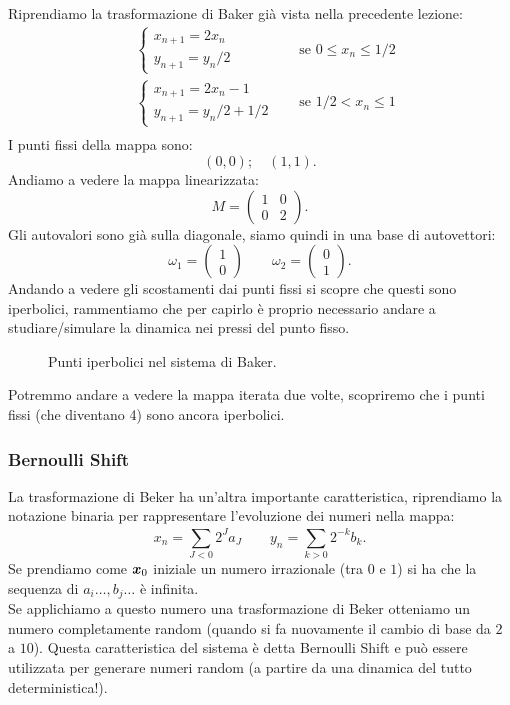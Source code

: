 \noindent
\begin{exmp}
    Riprendiamo la trasformazione di Baker già vista nella precedente lezione:
    \[\begin{aligned}
	&
        \begin{cases}
            x_{n+1} = 2 x_n\\
	    y_{n+1} = y_n /2
	\end{cases} & \quad \text{se } 0 \le x_n \le  1 /2\\
	& 
        \begin{cases}
            x_{n+1} = 2 x_n - 1\\
	    y_{n+1} = y_n /2 + 1 /2
	\end{cases} & \quad \text{se } 1 /2 < x_n \le 1 \\
    \end{aligned}\]
    I punti fissi della mappa sono:
    \[
	(0, 0); \quad (1, 1)
    .\] 
    Andiamo a vedere la mappa linearizzata:
    \[
	M = 
        \begin{pmatrix} 
	    1 & 0 \\
	    0 & 2
	\end{pmatrix} 
    .\] 
    Gli autovalori sono già sulla diagonale, siamo quindi in una base di autovettori:
    \[
        \omega_1 = \begin{pmatrix} 1\\0 \end{pmatrix} \qquad
	\omega_2 = \begin{pmatrix} 0 \\1 \end{pmatrix} 
    .\] 
    Andando a vedere gli scostamenti dai punti fissi si scopre che questi sono iperbolici, rammentiamo che per capirlo è proprio necessario andare a studiare/simulare la dinamica nei pressi del punto fisso.
    \begin{figure}[H]
        \centering
        \caption{\scriptsize Punti iperbolici nel sistema di Baker.}
        \label{fig:22_baker}
    \end{figure}
    \noindent
    Potremmo andare a vedere la mappa iterata due volte, scopriremo che i punti fissi (che diventano 4) sono ancora iperbolici.
    \subsubsection{Bernoulli Shift}%
    \label{subsub:Bernoulli Shift}
    La trasformazione di Beker ha un'altra importante caratteristica, riprendiamo la notazione binaria per rappresentare l'evoluzione dei numeri nella mappa: 
    \[
        x_n = \sum_{J<0}^{} 2^{J}a_J \qquad y_n = \sum_{k>0}^{} 2^{-k} b_k
    .\]
    Se prendiamo come $\boldsymbol{x}_0$ iniziale un numero irrazionale (tra $0$ e $1$) si ha che la sequenza di $a_i\ldots, b_j\ldots$ è infinita. \\
    Se applichiamo a questo numero una trasformazione di Beker otteniamo un numero completamente random (quando si fa nuovamente il cambio di base da $2$ a $10$). Questa caratteristica del sistema è detta Bernoulli Shift e può essere utilizzata per generare numeri random (a partire da una dinamica del tutto deterministica!). 
\end{exmp}
\noindent
